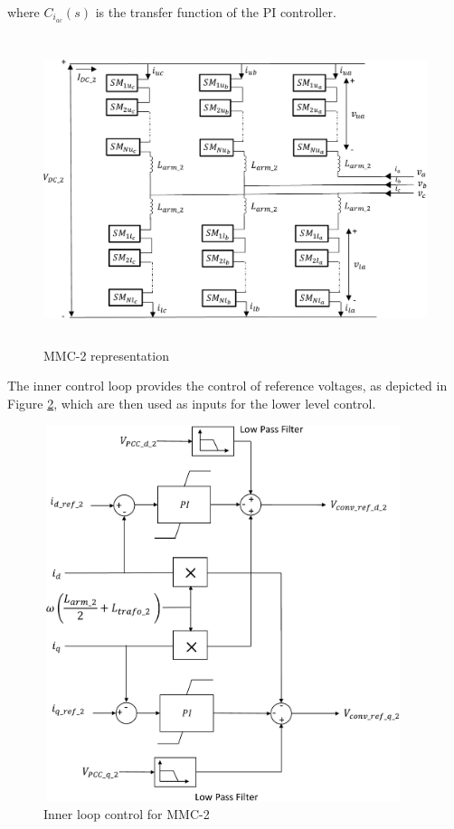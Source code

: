 where $C_{i_{ac}}\left(s\right)$ is the transfer function of the \gls{PI} controller.

\begin{figure}[H]
\centering
    \includegraphics[height = 9cm,width = 13.5cm]{Diagrams/Chapter_4/MMC_pow_system_2.pdf}
    \caption{MMC-2 representation \cite{saad2015modelisation}}
    \label{fig:MMC_pow_system_2}
\end{figure}

The inner control loop provides the control of reference voltages, as depicted in Figure \ref{fig:Inner_control_loop_MMC}, which are then used as inputs for the lower level control.

\begin{figure}[H]
\centering
    \includegraphics[height = 11cm,width = 10.5cm]{Diagrams/Chapter_4/Inner_control_loop_MMC.pdf}
    \caption{Inner loop control for MMC-2 \cite{saad2015modelisation}}
    \label{fig:Inner_control_loop_MMC}
\end{figure}

